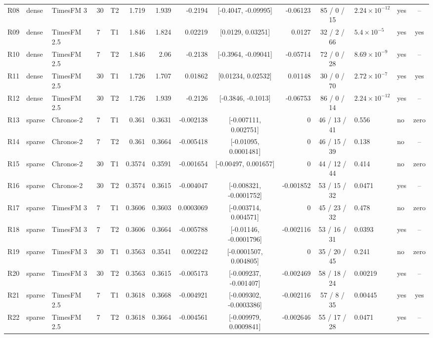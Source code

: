 \begin{table}[t]
\begin{tabular}{llllcrrrcrcllc}
R08 & dense & TimesFM 3 & 30 & T2 & 1.719 & 1.939 & -0.2194 & [-0.4047, -0.09995] & -0.06123 & 85 / 0 / 15 & $2.24 \times 10^{-12}$ & yes & -- \\
R09 & dense & TimesFM 2.5 & 7 & T1 & 1.846 & 1.824 & 0.02219 & [0.0129, 0.03251] & 0.0127 & 32 / 2 / 66 & $5.4 \times 10^{-5}$ & yes & yes \\
R10 & dense & TimesFM 2.5 & 7 & T2 & 1.846 & 2.06 & -0.2138 & [-0.3964, -0.09041] & -0.05714 & 72 / 0 / 28 & $8.69 \times 10^{-9}$ & yes & -- \\
R11 & dense & TimesFM 2.5 & 30 & T1 & 1.726 & 1.707 & 0.01862 & [0.01234, 0.02532] & 0.01148 & 30 / 0 / 70 & $2.72 \times 10^{-7}$ & yes & yes \\
R12 & dense & TimesFM 2.5 & 30 & T2 & 1.726 & 1.939 & -0.2126 & [-0.3846, -0.1013] & -0.06753 & 86 / 0 / 14 & $2.24 \times 10^{-12}$ & yes & -- \\
R13 & sparse & Chronos-2 & 7 & T1 & 0.361 & 0.3631 & -0.002138 & [-0.007111, 0.002751] & 0 & 46 / 13 / 41 & 0.556 & no & zero \\
R14 & sparse & Chronos-2 & 7 & T2 & 0.361 & 0.3664 & -0.005418 & [-0.01095, 0.0001481] & 0 & 46 / 15 / 39 & 0.138 & no & -- \\
R15 & sparse & Chronos-2 & 30 & T1 & 0.3574 & 0.3591 & -0.001654 & [-0.00497, 0.001657] & 0 & 44 / 12 / 44 & 0.414 & no & zero \\
R16 & sparse & Chronos-2 & 30 & T2 & 0.3574 & 0.3615 & -0.004047 & [-0.008321, -0.0001752] & -0.001852 & 53 / 15 / 32 & 0.0471 & yes & -- \\
R17 & sparse & TimesFM 3 & 7 & T1 & 0.3606 & 0.3603 & 0.0003069 & [-0.003714, 0.004571] & 0 & 45 / 23 / 32 & 0.478 & no & zero \\
R18 & sparse & TimesFM 3 & 7 & T2 & 0.3606 & 0.3664 & -0.005788 & [-0.01146, -0.0001796] & -0.002116 & 53 / 16 / 31 & 0.0393 & yes & -- \\
R19 & sparse & TimesFM 3 & 30 & T1 & 0.3563 & 0.3541 & 0.002242 & [-0.0001507, 0.004805] & 0 & 35 / 20 / 45 & 0.241 & no & zero \\
R20 & sparse & TimesFM 3 & 30 & T2 & 0.3563 & 0.3615 & -0.005173 & [-0.009237, -0.001407] & -0.002469 & 58 / 18 / 24 & 0.00219 & yes & -- \\
R21 & sparse & TimesFM 2.5 & 7 & T1 & 0.3618 & 0.3668 & -0.004921 & [-0.009302, -0.0003386] & -0.002116 & 57 / 8 / 35 & 0.00445 & yes & yes \\
R22 & sparse & TimesFM 2.5 & 7 & T2 & 0.3618 & 0.3664 & -0.004561 & [-0.009979, 0.0009841] & -0.002646 & 55 / 17 / 28 & 0.0471 & yes & -- \\

\end{tabular}
\end{table}
